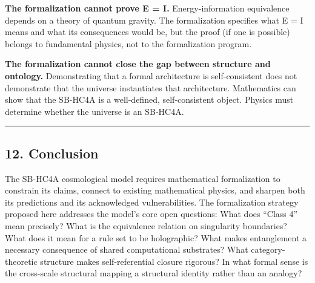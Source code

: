 \documentclass[
]{article}
\begin{document}
\textbf{The formalization cannot prove E = I.} Energy-information
equivalence depends on a theory of quantum gravity. The formalization
specifies what E = I means and what its consequences would be, but the
proof (if one is possible) belongs to fundamental physics, not to the
formalization program.

\textbf{The formalization cannot close the gap between structure and
ontology.} Demonstrating that a formal architecture is self-consistent
does not demonstrate that the universe instantiates that architecture.
Mathematics can show that the SB-HC4A is a well-defined, self-consistent
object. Physics must determine whether the universe is an SB-HC4A.

\begin{center}\rule{0.5\linewidth}{0.5pt}\end{center}

\hypertarget{conclusion}{%
\subsection{12. Conclusion}\label{conclusion}}

The SB-HC4A cosmological model requires mathematical formalization to
constrain its claims, connect to existing mathematical physics, and
sharpen both its predictions and its acknowledged vulnerabilities. The
formalization strategy proposed here addresses the model's core open
questions: What does ``Class 4'' mean precisely? What is the equivalence
relation on singularity boundaries? What does it mean for a rule set to
be holographic? What makes entanglement a necessary consequence of
shared computational substrates? What category-theoretic structure makes
self-referential closure rigorous? In what formal sense is the
cross-scale structural mapping a structural identity rather than an
analogy?
\end{document}
